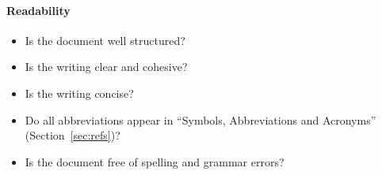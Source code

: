 \paragraph{Readability}
\begin{itemize}

    \item Is the document well structured?

    \item Is the writing clear and cohesive?

    \item Is the writing concise?

    \item Do all abbreviations appear in ``Symbols, Abbreviations and
    Acronyms'' (Section~\ref{sec:refs})?

    \item Is the document free of spelling and grammar errors?

\end{itemize}